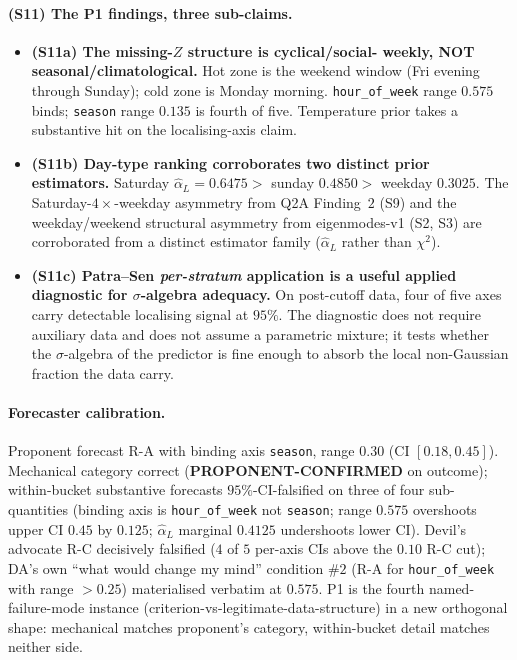 \documentclass[11pt]{article}
\theoremstyle{definition}
\theoremstyle{plain}
\begin{document}
\paragraph{(S11) The P1 findings, three sub-claims.}
\begin{itemize}[leftmargin=2em]
\item \textbf{(S11a) The missing-$Z$ structure is cyclical/social-
weekly, NOT seasonal/climatological.} Hot zone is the weekend window
(Fri evening through Sunday); cold zone is Monday morning.
\texttt{hour\_of\_week} range $0.575$ binds; \texttt{season} range
$0.135$ is fourth of five. Temperature prior takes a substantive
hit on the localising-axis claim.

\item \textbf{(S11b) Day-type ranking corroborates two distinct
prior estimators.} Saturday $\hat\alpha_L = 0.6475 >$ sunday
$0.4850 >$ weekday $0.3025$. The Saturday-$4\times$-weekday
asymmetry from Q2A Finding~$2$ (S9) and the weekday/weekend
structural asymmetry from eigenmodes-v1 (S2, S3) are corroborated
from a distinct estimator family ($\hat\alpha_L$ rather than
$\chi^2$).

\item \textbf{(S11c) Patra--Sen \emph{per-stratum} application is
a useful applied diagnostic for $\sigma$-algebra adequacy.} On
post-cutoff data, four of five axes carry detectable localising
signal at $95\%$. The diagnostic does not require auxiliary data
and does not assume a parametric mixture; it tests whether the
$\sigma$-algebra of the predictor is fine enough to absorb the
local non-Gaussian fraction the data carry.
\end{itemize}

\paragraph{Forecaster calibration.}
Proponent forecast R-A with binding axis \texttt{season}, range
$0.30$ (CI $[0.18, 0.45]$). Mechanical category correct
(\textbf{PROPONENT-CONFIRMED} on outcome); within-bucket
substantive forecasts $95\%$-CI-falsified on three of four
sub-quantities (binding axis is \texttt{hour\_of\_week} not
\texttt{season}; range $0.575$ overshoots upper CI $0.45$ by
$0.125$; $\hat\alpha_L$ marginal $0.4125$ undershoots lower CI).
Devil's advocate R-C decisively falsified ($4$ of $5$ per-axis
CIs above the $0.10$ R-C cut); DA's own ``what would change my
mind'' condition $\#2$ (R-A for \texttt{hour\_of\_week} with range
$> 0.25$) materialised verbatim at $0.575$. P1 is the fourth
named-failure-mode instance (criterion-vs-legitimate-data-structure)
in a new orthogonal shape: mechanical matches proponent's category,
within-bucket detail matches neither side.
\end{document}
